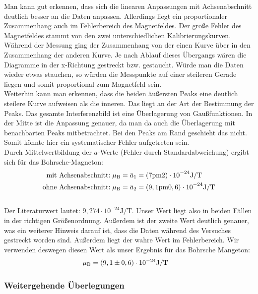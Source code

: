Man kann gut erkennen, dass sich die linearen Anpassungen mit Achsenabschnitt deutlich besser an die Daten anpassen. Allerdings liegt ein proportionaler Zusammenhang auch im Fehlerbereich des Magnetfeldes. Der große Fehler des Magnetfeldes stammt von den zwei unterschiedlichen Kalibrierungskurven. Während der Messung ging der Zusammenhang von der einen Kurve über in den Zusammenhang der anderen Kurve. Je nach Ablauf dieses Übergangs wären die Diagramme in der x-Richtung gestreckt bzw. gestaucht. Würde man die Daten wieder etwas stauchen, so würden die Messpunkte auf einer steileren Gerade liegen und somit proportional zum Magnetfeld sein.\\
Weiterhin kann man erkennen, dass die beiden äußersten Peaks eine deutlich steilere Kurve aufweisen als die inneren. Das liegt an der Art der Bestimmung der Peaks. Das gesamte Interferenzbild ist eine Überlagerung von Gaußfunktionen. In der Mitte ist die Anpassung genauer, da man da auch die Überlagerung mit benachbarten Peaks mitbetrachtet. Bei den Peaks am Rand geschieht das nicht. Somit könnte hier ein systematischer Fehler aufgetreten sein.\\
 
Durch Mittelwertbildung der $a$-Werte (Fehler durch Standardabweichung) ergibt sich für das Bohrsche-Magneton:\\
\begin{align*}
\text{mit Achsenabschnitt:}\;& \mu\ind{B} = \bar{a}_1 = \si{(7 \pm 2) \cdot 10^{-24} \joule/\tesla}\\
\text{ohne Achsenabschnitt:}\;& \mu\ind{B} = \bar{a}_2 = \si{(9,1 \pm 0,6) \cdot 10^{-24} \joule/\tesla}\\
\end{align*}\\
Der Literaturwert lautet: $9,274 \cdot 10^{-24} \si{\joule/\tesla}$\cite{konst}. Unser Wert liegt also in beiden Fällen in der richtigen Größenordnung. Außerdem ist der zweite Wert deutlich genauer, was ein weiterer Hinweis darauf ist, dass die Daten während des Versuches gestreckt worden sind. Außerdem liegt der wahre Wert im Fehlerbereich. Wir verwenden deswegen diesen Wert als unser Ergebnis für das Bohrsche Mangeton:
\begin{align*}
\mu\ind{B} &= (9,1 \pm 0,6) \cdot 10^{-24} \si{\joule/\tesla}
\end{align*}

\subsubsection{Weitergehende Überlegungen}
